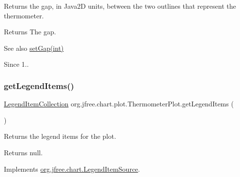 Returns the gap, in Java2D units, between the two outlines that represent the thermometer.

\begin{DoxyReturn}{Returns}
The gap.
\end{DoxyReturn}
\begin{DoxySeeAlso}{See also}
\mbox{\hyperlink{classorg_1_1jfree_1_1chart_1_1plot_1_1_thermometer_plot_a2589f0ef33b49f571f4f2e42e1e70cc3}{set\+Gap(int)}}
\end{DoxySeeAlso}
\begin{DoxySince}{Since}
1.. 
\end{DoxySince}
\mbox{\label{classorg_1_1jfree_1_1chart_1_1plot_1_1_thermometer_plot_a36b314aaada1e777a33202d88c1f9bba}} 
\subsubsection{\texorpdfstring{get\+Legend\+Items()}{getLegendItems()}}
{\footnotesize\ttfamily \mbox{\hyperlink{classorg_1_1jfree_1_1chart_1_1_legend_item_collection}{Legend\+Item\+Collection}} org.\+jfree.\+chart.\+plot.\+Thermometer\+Plot.\+get\+Legend\+Items (\begin{DoxyParamCaption}{ }\end{DoxyParamCaption})}

Returns the legend items for the plot.

\begin{DoxyReturn}{Returns}
{\ttfamily null}. 
\end{DoxyReturn}


Implements \mbox{\hyperlink{interfaceorg_1_1jfree_1_1chart_1_1_legend_item_source_a224409463c4f7a8ef0e2a9df337e6d3b}{org.\+jfree.\+chart.\+Legend\+Item\+Source}}.

\mbox{\label{classorg_1_1jfree_1_1chart_1_1plot_1_1_thermometer_plot_aaf4768e80d5df9af624c7c1e83dc8d75}} 
